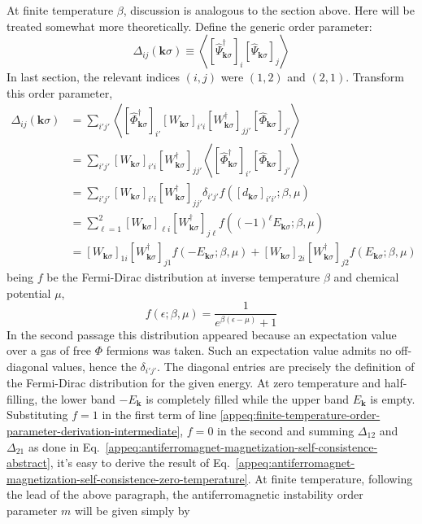 At finite temperature $\beta$, discussion is analogous to the section above. Here will be treated somewhat more theoretically. Define the generic order parameter:
\[
	\Delta_{ij} (\mathbf{k}\sigma) \equiv \left\langle
		[
			\hat \Psi_{\mathbf{k}\sigma}^\dagger
		]_i [
			\hat \Psi_{\mathbf{k}\sigma}
		]_j
	\right\rangle
\]
In last section, the relevant indices $(i,j)$ were $(1,2)$ and $(2,1)$. Transform this order parameter,
\begin{align}
	\Delta_{ij} (\mathbf{k}\sigma) &= \sum_{i'j'} \left\langle
		[
			\hat \Phi_{\mathbf{k}\sigma}^\dagger
		]_{i'} 
		[
			W_{\mathbf{k}\sigma}
		]_{i'i} [
			W_{\mathbf{k}\sigma}^\dagger
		]_{jj'}
		[
			\hat \Phi_{\mathbf{k}\sigma}
		]_{j'}
	\right\rangle \nonumber \\
	&= 
	\sum_{i'j'} [
		W_{\mathbf{k}\sigma}
	]_{i'i} [
		W_{\mathbf{k}\sigma}^\dagger
	]_{jj'}
	\left\langle
		[
			\hat \Phi_{\mathbf{k}\sigma}^\dagger
		]_{i'} 
		[
			\hat \Phi_{\mathbf{k}\sigma}
		]_{j'}
	\right\rangle \nonumber \\
	&= 
	\sum_{i'j'} [
		W_{\mathbf{k}\sigma}
	]_{i'i} [
		W_{\mathbf{k}\sigma}^\dagger
	]_{jj'}
	\delta_{i'j'} f\left(
		[d_{\mathbf{k}\sigma}]_{i'i'}; \beta,\mu
	\right) \nonumber \\
	&= 
	\sum_{\ell=1}^2 [
		W_{\mathbf{k}\sigma}
	]_{\ell i} [
		W_{\mathbf{k}\sigma}^\dagger
	]_{j\ell}
	f\left(
		(-1)^\ell E_{\mathbf{k}\sigma}; \beta,\mu
	\right) \nonumber \\
	&= 
	[
		W_{\mathbf{k}\sigma}
	]_{1 i} [
		W_{\mathbf{k}\sigma}^\dagger
	]_{j 1} f\left(
		-E_{\mathbf{k}\sigma}; \beta,\mu
	\right) + [
		W_{\mathbf{k}\sigma}
	]_{2 i} [
		W_{\mathbf{k}\sigma}^\dagger
	]_{j 2} f\left(
		E_{\mathbf{k}\sigma}; \beta,\mu
	\right) \label{appeq:finite-temperature-order-parameter-derivation-intermediate}
\end{align}
being $f$ be the Fermi-Dirac distribution at inverse temperature $\beta$ and chemical potential $\mu$,
\[
	f(\epsilon;\beta,\mu) = \frac{1}{e^{\beta(\epsilon-\mu)}+1} 
\]
In the second passage this distribution appeared because an expectation value over a gas of free $\Phi$ fermions was taken. Such an expectation value admits no off-diagonal values, hence the $\delta_{i'j'}$. The diagonal entries are precisely the definition of the Fermi-Dirac distribution for the given energy. At zero temperature and half-filling, the lower band $-E_\mathbf{k}$ is completely filled while the upper band $E_\mathbf{k}$ is empty. Substituting $f=1$ in the first term of line \eqref{appeq:finite-temperature-order-parameter-derivation-intermediate}, $f=0$ in the second and summing $\Delta_{12}$ and $\Delta_{21}$ as done in Eq.~\eqref{appeq:antiferromagnet-magnetization-self-consistence-abstract}, it's easy to derive the result of Eq.~\eqref{appeq:antiferromagnet-magnetization-self-consistence-zero-temperature}. At finite temperature, following the lead of the above paragraph, the antiferromagnetic instability order parameter $m$ will be given simply by
